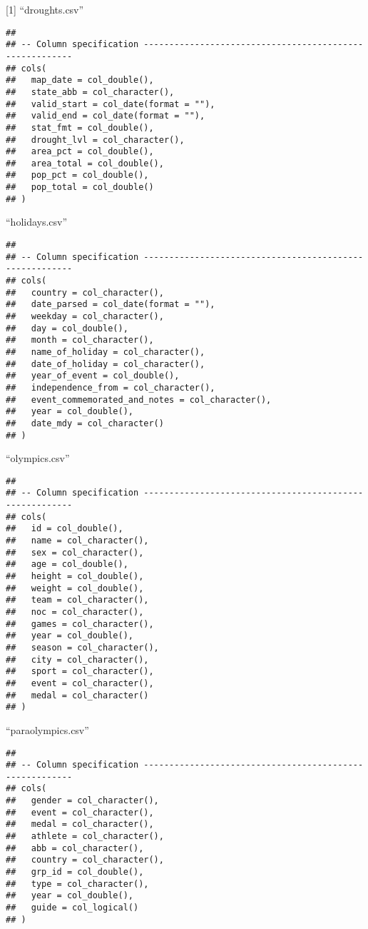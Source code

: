 \documentclass[
]{article}
\begin{document}
{[}1{]} ``droughts.csv''

\begin{verbatim}
## 
## -- Column specification --------------------------------------------------------
## cols(
##   map_date = col_double(),
##   state_abb = col_character(),
##   valid_start = col_date(format = ""),
##   valid_end = col_date(format = ""),
##   stat_fmt = col_double(),
##   drought_lvl = col_character(),
##   area_pct = col_double(),
##   area_total = col_double(),
##   pop_pct = col_double(),
##   pop_total = col_double()
## )
\end{verbatim}

\pagebreak
[1]

``holidays.csv''

\begin{verbatim}
## 
## -- Column specification --------------------------------------------------------
## cols(
##   country = col_character(),
##   date_parsed = col_date(format = ""),
##   weekday = col_character(),
##   day = col_double(),
##   month = col_character(),
##   name_of_holiday = col_character(),
##   date_of_holiday = col_character(),
##   year_of_event = col_double(),
##   independence_from = col_character(),
##   event_commemorated_and_notes = col_character(),
##   year = col_double(),
##   date_mdy = col_character()
## )
\end{verbatim}

\pagebreak
[1]

``olympics.csv''

\begin{verbatim}
## 
## -- Column specification --------------------------------------------------------
## cols(
##   id = col_double(),
##   name = col_character(),
##   sex = col_character(),
##   age = col_double(),
##   height = col_double(),
##   weight = col_double(),
##   team = col_character(),
##   noc = col_character(),
##   games = col_character(),
##   year = col_double(),
##   season = col_character(),
##   city = col_character(),
##   sport = col_character(),
##   event = col_character(),
##   medal = col_character()
## )
\end{verbatim}

\pagebreak
[1]

``paraolympics.csv''

\begin{verbatim}
## 
## -- Column specification --------------------------------------------------------
## cols(
##   gender = col_character(),
##   event = col_character(),
##   medal = col_character(),
##   athlete = col_character(),
##   abb = col_character(),
##   country = col_character(),
##   grp_id = col_double(),
##   type = col_character(),
##   year = col_double(),
##   guide = col_logical()
## )
\end{verbatim}
\end{document}
